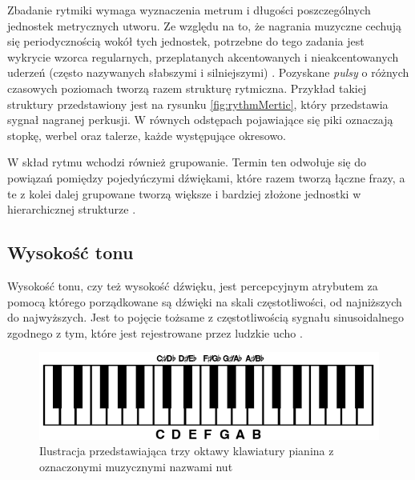 \documentclass[12pt,a4paper,twoside]{mwart}
\begin{document}
Zbadanie rytmiki wymaga wyznaczenia metrum i długości poszczególnych jednostek metrycznych utworu. Ze względu na to, że nagrania muzyczne cechują się periodycznością wokół tych jednostek, potrzebne do tego zadania jest wykrycie wzorca regularnych, przeplatanych akcentowanych i nieakcentowanych uderzeń (często nazywanych słabszymi i silniejszymi) 
\cite[12-35]{Transcription:Lerdahl:GenerativeTheory}.
Pozyskane \textit{pulsy} o różnych czasowych poziomach tworzą razem strukturę rytmiczna. Przykład takiej struktury przedstawiony jest na rysunku \ref{fig:rythmMertic}, który przedstawia sygnał nagranej perkusji. W równych odstępach pojawiające się piki oznaczają stopkę, werbel oraz talerze, każde występujące okresowo.

W skład rytmu wchodzi również grupowanie. Termin ten odwołuje się do powiązań pomiędzy pojedyńczymi dźwiękami, które razem tworzą łączne frazy, a te z kolei dalej grupowane tworzą większe i bardziej złożone jednostki w hierarchicznej strukturze 
\cite[12-35]{Transcription:Lerdahl:GenerativeTheory}.


\subsection{Wysokość tonu}\label{sec:pitch}
Wysokość tonu, czy też wysokość dźwięku, jest percepcyjnym atrybutem za pomocą którego porządkowane są dźwięki na skali częstotliwości, od najniższych do najwyższych. Jest to pojęcie tożsame z częstotliwością sygnału sinusoidalnego zgodnego z tym, które jest rejestrowane przez ludzkie ucho 
\cite[3492-3493]{Transcription:Hartmann:PitchPeriodicityAuditoryOrganization}.

\begin{figure}[H]
  \begin{center}
    \includegraphics[scale=0.5]{images/PianoRoll.png}
    \caption{Ilustracja przedstawiająca trzy oktawy klawiatury pianina z oznaczonymi muzycznymi nazwami nut}
    \label{fig:pianoRoll}
  \end{center}
\end{figure}
\end{document}
